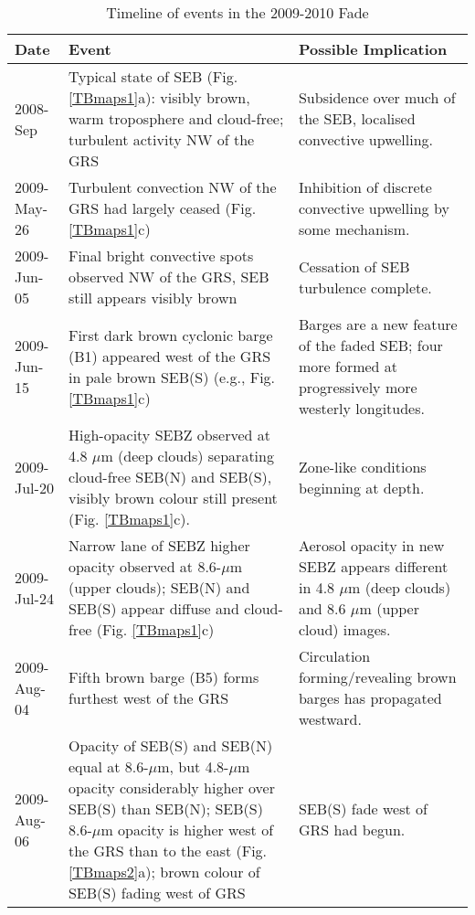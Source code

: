 \documentclass[final,5p,times,twocolumn,authoryear]{elsarticle}
\begin{document}
\begin{table*}[htdp]
\caption{Timeline of events in the 2009-2010 Fade}
\begin{center}
\begin{tabular}{|l|p{10cm}|p{6cm}|}
\hline
\textbf{Date} & \textbf{Event} & \textbf{Possible Implication}  \\
\hline

2008-Sep & Typical state of SEB (Fig. \ref{TBmaps1}a): visibly brown, warm troposphere and cloud-free; turbulent activity NW of the GRS & Subsidence over much of the SEB, localised convective upwelling.\\
\hline
2009-May-26 & Turbulent convection NW of the GRS had largely ceased (Fig. \ref{TBmaps1}c) & Inhibition of discrete convective upwelling by some mechanism. \\
\hline

2009-Jun-05 & Final bright convective spots observed NW of the GRS, SEB still appears visibly brown & Cessation of SEB turbulence complete. \\
\hline

2009-Jun-15 & First dark brown cyclonic barge (B1) appeared west of the GRS \citep{10rogers} in pale brown SEB(S) (e.g., Fig. \ref{TBmaps1}c) & Barges are a new feature of the faded SEB; four more formed at progressively more westerly longitudes. \\
\hline

2009-Jul-20 & High-opacity SEBZ observed at 4.8 $\mu$m (deep clouds) separating cloud-free SEB(N) and SEB(S), visibly brown colour still present (Fig. \ref{TBmaps1}c). & Zone-like conditions beginning at depth.\\
\hline

2009-Jul-24 & Narrow lane of SEBZ higher opacity observed at 8.6-$\mu$m (upper clouds); SEB(N) and SEB(S) appear diffuse and cloud-free (Fig. \ref{TBmaps1}c) & Aerosol opacity in new SEBZ appears different in 4.8 $\mu$m (deep clouds) and 8.6 $\mu$m (upper cloud) images. \\
\hline

2009-Aug-04 & Fifth brown barge (B5) forms furthest west of the GRS & Circulation forming/revealing brown barges has propagated westward. \\
\hline

2009-Aug-06 & Opacity of SEB(S) and SEB(N) equal at 8.6-$\mu$m, but 4.8-$\mu$m opacity considerably higher over SEB(S) than SEB(N); SEB(S) 8.6-$\mu$m opacity is higher west of the GRS than to the east (Fig. \ref{TBmaps2}a); brown colour of SEB(S) fading west of GRS & SEB(S) fade west of GRS had begun.\\
\hline


\end{tabular}
\end{center}
\end{table*}
\end{document}
